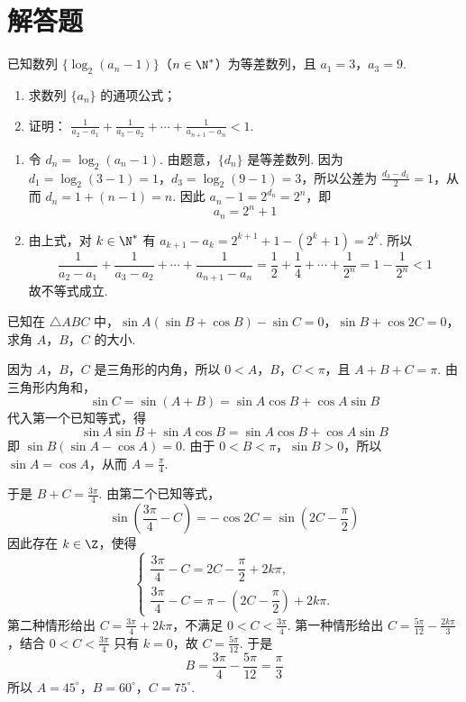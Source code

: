 \section{解答题}
\begin{problem}
已知数列 \(\{\log_2(a_n - 1)\}\)（\(n \in \N^*\)）为等差数列，且 \(a_1 = 3\)，\(a_3 = 9\).

\begin{enumerate}
\item 求数列 \( \{a_{n}\} \) 的通项公式；
\item 证明： \( \frac{1}{a_{2}-a_{1}}+\frac{1}{a_{3}-a_{2}}+\cdots+\frac{1}{a_{n+1}-a_{n}}<1 \).
\end{enumerate}

\begin{solution}
\begin{enumerate}
\item
令 \(d_n=\log_2(a_n-1)\). 由题意，\(\{d_n\}\) 是等差数列. 因为
\(d_1=\log_2(3-1)=1\)，\(d_3=\log_2(9-1)=3\)，所以公差为
\(\frac{d_3-d_1}{2}=1\)，从而 \(d_n=1+(n-1)=n\). 因此
\(a_n-1=2^{d_n}=2^n\)，即
\[
a_n=2^n+1
\]

\item
由上式，对 \(k\in\N^*\) 有
\(a_{k+1}-a_k=2^{k+1}+1-(2^k+1)=2^k\). 所以
\[
\frac{1}{a_2-a_1}+\frac{1}{a_3-a_2}+\cdots+\frac{1}{a_{n+1}-a_n}
=\frac12+\frac14+\cdots+\frac{1}{2^n}
=1-\frac{1}{2^n}<1
\]
故不等式成立.
\end{enumerate}
\end{solution}
\end{problem}

\begin{problem}
已知在 \(\triangle ABC\) 中，\(\sin A(\sin B + \cos B) - \sin C = 0\)，\(\sin B + \cos 2C = 0\)，求角 \(A\)，\(B\)，\(C\) 的大小.

\begin{solution}
因为 \(A\)，\(B\)，\(C\) 是三角形的内角，所以
\(0<A\)，\(B\)，\(C<\pi\)，且 \(A+B+C=\pi\). 由三角形内角和，
\[
\sin C=\sin(A+B)=\sin A\cos B+\cos A\sin B
\]
代入第一个已知等式，得
\[
\sin A\sin B+\sin A\cos B
=\sin A\cos B+\cos A\sin B
\]
即 \(\sin B(\sin A-\cos A)=0\). 由于 \(0<B<\pi\)，\(\sin B>0\)，所以
\(\sin A=\cos A\)，从而 \(A=\frac{\pi}{4}\).

于是 \(B+C=\frac{3\pi}{4}\). 由第二个已知等式，
\[
\sin\left(\frac{3\pi}{4}-C\right)=-\cos 2C
=\sin\left(2C-\frac{\pi}{2}\right)
\]
因此存在 \(k\in\Z\)，使得
\[
\begin{cases}
\dfrac{3\pi}{4}-C=2C-\dfrac{\pi}{2}+2k\pi,\\
\dfrac{3\pi}{4}-C=\pi-\left(2C-\dfrac{\pi}{2}\right)+2k\pi.
\end{cases}
\]
第二种情形给出 \(C=\frac{3\pi}{4}+2k\pi\)，不满足
\(0<C<\frac{3\pi}{4}\). 第一种情形给出
\(C=\frac{5\pi}{12}-\frac{2k\pi}{3}\)，结合
\(0<C<\frac{3\pi}{4}\) 只有 \(k=0\)，故 \(C=\frac{5\pi}{12}\). 于是
\[
B=\frac{3\pi}{4}-\frac{5\pi}{12}=\frac{\pi}{3}
\]
所以 \(A=45^{\circ}\)，\(B=60^{\circ}\)，\(C=75^{\circ}\).
\end{solution}
\end{problem}


